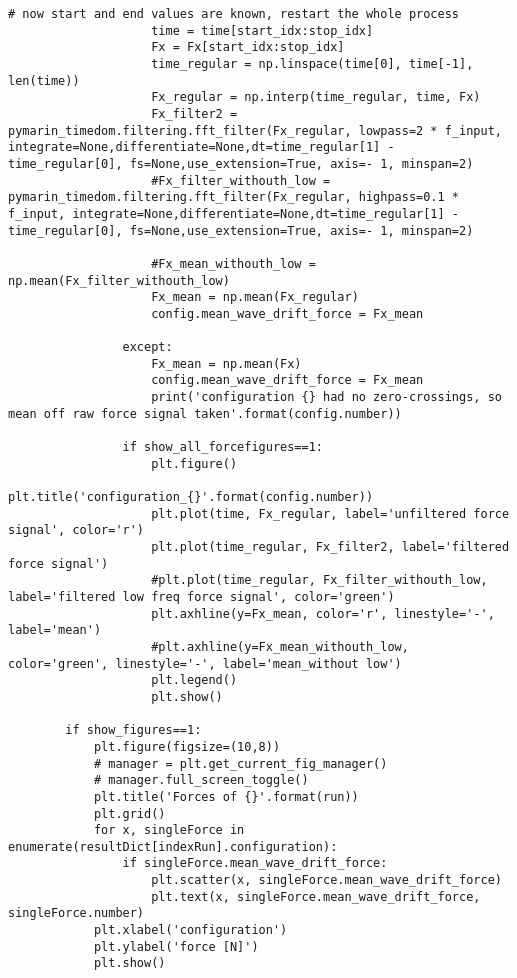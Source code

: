 \begin{mdframed}[backgroundcolor=light-gray, roundcorner=10pt,leftmargin=1, rightmargin=1, innerleftmargin=0, innertopmargin=7,innerbottommargin=0, outerlinewidth=1, linecolor=light-gray]
\begin{lstlisting}[linewidth=\columnwidth,caption=Functions used in post-processing ., label=script: post processing functions]
                    # now start and end values are known, restart the whole process
                    time = time[start_idx:stop_idx]
                    Fx = Fx[start_idx:stop_idx]
                    time_regular = np.linspace(time[0], time[-1], len(time))
                    Fx_regular = np.interp(time_regular, time, Fx)
                    Fx_filter2 = pymarin_timedom.filtering.fft_filter(Fx_regular, lowpass=2 * f_input, integrate=None,differentiate=None,dt=time_regular[1] - time_regular[0], fs=None,use_extension=True, axis=- 1, minspan=2)
                    #Fx_filter_withouth_low = pymarin_timedom.filtering.fft_filter(Fx_regular, highpass=0.1 * f_input, integrate=None,differentiate=None,dt=time_regular[1] - time_regular[0], fs=None,use_extension=True, axis=- 1, minspan=2)

                    #Fx_mean_withouth_low = np.mean(Fx_filter_withouth_low)
                    Fx_mean = np.mean(Fx_regular)
                    config.mean_wave_drift_force = Fx_mean

                except:
                    Fx_mean = np.mean(Fx)
                    config.mean_wave_drift_force = Fx_mean
                    print('configuration {} had no zero-crossings, so mean off raw force signal taken'.format(config.number))

                if show_all_forcefigures==1:
                    plt.figure()
                    plt.title('configuration_{}'.format(config.number))
                    plt.plot(time, Fx_regular, label='unfiltered force signal', color='r')
                    plt.plot(time_regular, Fx_filter2, label='filtered force signal')
                    #plt.plot(time_regular, Fx_filter_withouth_low, label='filtered low freq force signal', color='green')
                    plt.axhline(y=Fx_mean, color='r', linestyle='-', label='mean')
                    #plt.axhline(y=Fx_mean_withouth_low, color='green', linestyle='-', label='mean_without low')
                    plt.legend()
                    plt.show()

        if show_figures==1:
            plt.figure(figsize=(10,8))
            # manager = plt.get_current_fig_manager()
            # manager.full_screen_toggle()
            plt.title('Forces of {}'.format(run))
            plt.grid()
            for x, singleForce in enumerate(resultDict[indexRun].configuration):
                if singleForce.mean_wave_drift_force:
                    plt.scatter(x, singleForce.mean_wave_drift_force)
                    plt.text(x, singleForce.mean_wave_drift_force, singleForce.number)
            plt.xlabel('configuration')
            plt.ylabel('force [N]')
            plt.show()


\end{lstlisting}
\end{mdframed}
